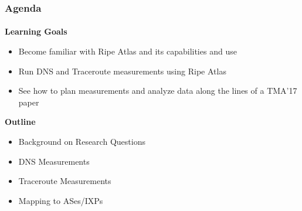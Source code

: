 


\PraesentationMasterKopfzeileDreizeiler

\PraesentationTitelseite

\PraesentationMasterStandard


\usetikzlibrary{shapes,arrows,shadows}



\begin{frame}[fragile]
	\frametitle{Agenda}
	\framesubtitle{}

	\textbf{Learning Goals}
	\begin{itemize}
		\item Become familiar with Ripe Atlas and its capabilities and use
		\item Run DNS and Traceroute measurements using Ripe Atlas
		\item See how to plan measurements and analyze data along the lines of a TMA'17 paper
	\end{itemize}	

	\textbf{Outline}
\begin{itemize}
	\item Background on Research Questions
	\item DNS Measurements
	\item Traceroute Measurements
	\item Mapping to ASes/IXPs
\end{itemize}	



\end{frame}
\clearpage


